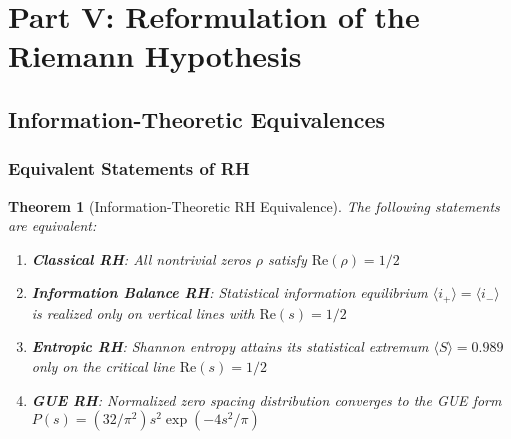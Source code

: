 \documentclass[12pt]{article}
\theoremstyle{plain}
\newtheorem{theorem}{Theorem}[section]
\theoremstyle{definition}
\begin{document}
\section{Part V: Reformulation of the Riemann Hypothesis}

\subsection{Information-Theoretic Equivalences}

\subsubsection{Equivalent Statements of RH}

\begin{theorem}[Information-Theoretic RH Equivalence]\label{thm:rh_equivalence}
The following statements are equivalent:
\begin{enumerate}
\item \textbf{Classical RH}: All nontrivial zeros $\rho$ satisfy $\text{Re}(\rho) = 1/2$

\item \textbf{Information Balance RH}: Statistical information equilibrium $\langle i_+ \rangle = \langle i_- \rangle$ is realized \emph{only} on vertical lines with $\text{Re}(s) = 1/2$

\item \textbf{Entropic RH}: Shannon entropy attains its statistical extremum $\langle S \rangle = 0.989$ \emph{only} on the critical line $\text{Re}(s) = 1/2$

\item \textbf{GUE RH}: Normalized zero spacing distribution converges to the GUE form $P(s) = (32/\pi^2) s^2 \exp(-4s^2/\pi)$
\end{enumerate}
\end{theorem}
\end{document}
